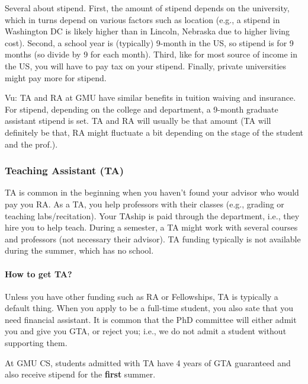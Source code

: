 \documentclass[11pt]{article}
\begin{document}
Several about stipend. First, the amount of stipend depends on the university, which in turns depend on various factors such as location (e.g., a stipend in Washington DC is likely higher than in Lincoln, Nebraska due to higher living cost). Second, a school year is (typically) 9-month in the US, so stipend is for 9 months (so divide by 9 for each month). Third, like for most source of income in the US, you will have to pay tax on your stipend. Finally, private universities might pay more for stipend.

\begin{tcolorbox}[left=1pt,right=1pt,top=1pt,bottom=1pt]
Vu: TA and RA at GMU have similar benefits in tuition waiving and insurance.  For stipend, depending on the college and department, a 9-month graduate assistant stipend is set.  TA and RA will usually be that amount (TA will definitely be that, RA might fluctuate a bit depending on the stage of the student and the prof.). 
\end{tcolorbox}

\subsubsection{Teaching Assistant (TA)}

TA is common in the beginning when you haven't found your advisor who would pay you RA. As a TA, you help professors with their classes (e.g., grading or teaching labs/recitation). Your TAship is paid through the department, i.e., they hire you to help teach.  During a semester, a TA might work with several courses and professors (not necessary their advisor).  TA funding typically is not available during the summer, which has no school.

\paragraph{How to get TA?}  Unless you have other funding such as RA or Fellowships, TA is typically a default thing. When you apply to be a full-time student, you also sate that you need financial assistant. It is common that the PhD committee will either admit you and give you GTA, or reject you; i.e., we do not admit a student without supporting them.  

\begin{tcolorbox}[left=1pt,right=1pt,top=1pt,bottom=1pt]
At GMU CS, students admitted with TA have  4 years of GTA guaranteed and also receive  stipend for the \textbf{first} summer.
\end{tcolorbox}
\end{document}
